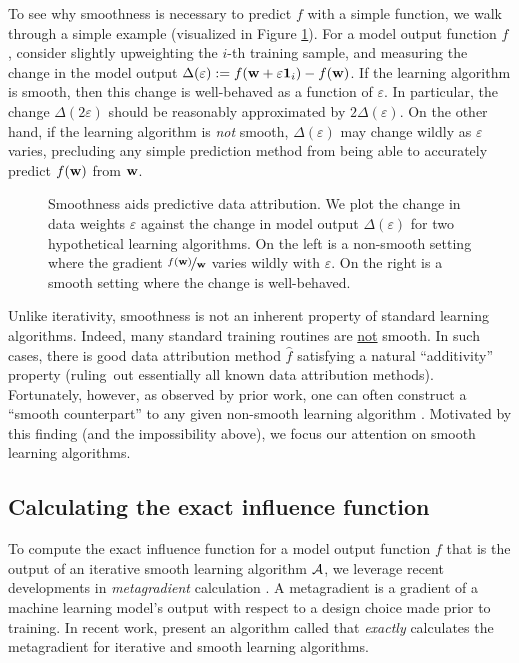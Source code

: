 To see why smoothness is necessary to predict $f$ with a simple function, we walk
through a simple example (visualized in Figure \ref{fig:smoothness}).
For a model output function $f$, consider slightly upweighting the
$i$-th training sample,
and measuring the change in the model output $\Delta(\varepsilon) :=
f(\mathbf{w} + \varepsilon \mathbf{1}_i) - f(\mathbf{w})$.
If the learning algorithm is smooth, then this change is well-behaved as a
function of $\varepsilon$.
In particular, the change $\Delta(2\varepsilon)$ should be
reasonably approximated by $2\Delta(\varepsilon)$.
On the other hand, if the learning algorithm is \textit{not} smooth,
$\Delta(\varepsilon)$ may change wildly as $\varepsilon$ varies,
precluding any simple prediction method from being able to accurately
predict $f(\mathbf{w})$ from $\mathbf{w}$.


\begin{figure}[h]
  \centering
  
  \caption{Smoothness aids predictive data attribution. We plot the change in
    data weights $\varepsilon$ against the change in model output
    $\Delta(\varepsilon)$ for two hypothetical learning algorithms. On the left
    is a non-smooth setting where the
    gradient $\nicefrac{f(\mathbf{w})}{\mathbf{w}}$ varies wildly with
    $\varepsilon$. On the
  right is a smooth setting where the change is well-behaved. }
  \label{fig:smoothness}
\end{figure}

\begin{remark}
  Unlike iterativity, smoothness is not an inherent
  property of standard learning algorithms.
  Indeed, many standard training routines are \underline{not}
  smooth.
  In such cases, there is
  \underline{} good data attribution method $\hat{f}$
  satisfying a natural ``additivity'' property \citep{saunshi2023understanding}
  (ruling~out essentially all known data attribution methods).
  Fortunately, however, as observed by prior work,
  one can often construct a ``smooth counterpart''
  to any given non-smooth learning algorithm \citep{engstrom2025optimizing}.
  Motivated by this finding (and the impossibility above),
  we focus our attention on smooth learning algorithms.
\end{remark}


\subsection{Calculating the exact influence function}
To compute the exact influence function for a model output function $f$
that is the output of an iterative smooth learning algorithm $\mathcal{A}{}$,
we leverage recent developments in {\em metagradient} calculation
\citep{maclaurin2015gradient,franceschi2017forward,lorraine2020optimizing,engstrom2025optimizing}.
A metagradient is a gradient of a machine learning model's output
with respect to a design choice made prior to training.
In recent work, \citet{engstrom2025optimizing} present an algorithm
called \replay{}
that {\em exactly} calculates the metagradient for iterative and smooth
learning algorithms.


